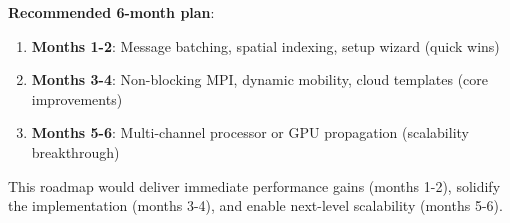 \textbf{Recommended 6-month plan}:
\begin{enumerate}
    \item \textbf{Months 1-2}: Message batching, spatial indexing, setup wizard (quick wins)
    \item \textbf{Months 3-4}: Non-blocking MPI, dynamic mobility, cloud templates (core improvements)
    \item \textbf{Months 5-6}: Multi-channel processor or GPU propagation (scalability breakthrough)
\end{enumerate}

This roadmap would deliver immediate performance gains (months 1-2), solidify the implementation (months 3-4), and enable next-level scalability (months 5-6).
